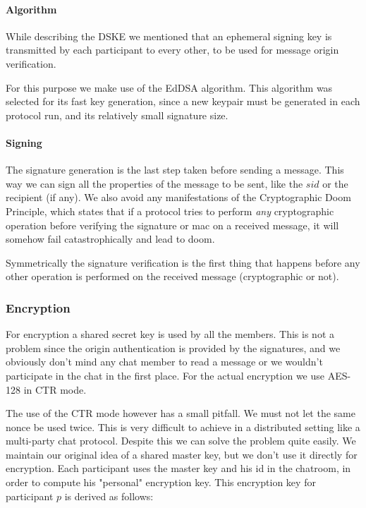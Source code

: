 \paragraph{Algorithm}
While describing the DSKE we mentioned that an ephemeral signing key is transmitted by each participant to every other, to be used for message origin verification.

For this purpose we make use of the EdDSA algorithm. This algorithm was selected for its fast key generation, since a new keypair must be generated in each protocol run, and its relatively small signature size.

\paragraph{Signing} \label{signing}
The signature generation is the last step taken before sending a message. This
way we can sign all the properties of the message to be sent, like the $sid$ or the
recipient (if any). We also avoid any manifestations of the Cryptographic Doom
Principle, which states that if a protocol tries to perform \emph{any}
cryptographic operation before verifying the signature or mac on a received
message, it will somehow fail catastrophically and lead to doom.

Symmetrically the signature verification is the first thing that happens before
any other operation is performed on the received message (cryptographic or not).

\subsubsection{Encryption}
For encryption a shared secret key is used by all the members. This is not a
problem since the origin authentication is provided by the signatures, and
we obviously don't mind any chat member to read a message or we wouldn't
participate in the chat in the first place. For the actual encryption we
use AES-128 in CTR mode.

The use of the CTR mode however has a small pitfall. We must not let the same
nonce be used twice. This is very difficult to achieve in a distributed setting
like a multi-party chat protocol. Despite this we can solve the problem quite
easily. We maintain our original idea of a shared master key, but we don't use
it directly for encryption. Each participant uses the master key and his id in
the chatroom, in order to compute his "personal" encryption key. This encryption
key for participant $p$ is derived as follows:


